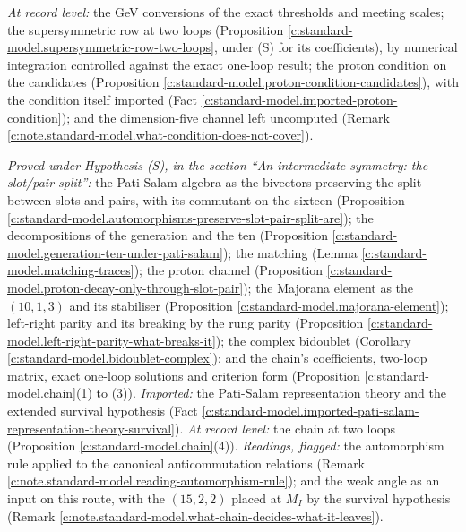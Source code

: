 \documentclass[11pt]{article}
\theoremstyle{definition}
\theoremstyle{plain}
\begin{document}
\emph{At record level:} the GeV conversions of the exact thresholds and meeting scales; the supersymmetric row at two loops (Proposition \ref{c:standard-model.supersymmetric-row-two-loops}, under (S) for its coefficients), by numerical integration controlled against the exact one-loop result; the proton condition on the candidates (Proposition \ref{c:standard-model.proton-condition-candidates}), with the condition itself imported (Fact \ref{c:standard-model.imported-proton-condition}); and the dimension-five channel left uncomputed (Remark \ref{c:note.standard-model.what-condition-does-not-cover}).

\emph{Proved under Hypothesis (S), in the section ``An intermediate symmetry: the slot/pair split'':} the Pati-Salam algebra as the bivectors preserving the split between slots and pairs, with its commutant on the sixteen (Proposition \ref{c:standard-model.automorphisms-preserve-slot-pair-split-are}); the decompositions of the generation and the ten (Proposition \ref{c:standard-model.generation-ten-under-pati-salam}); the matching (Lemma \ref{c:standard-model.matching-traces}); the proton channel (Proposition \ref{c:standard-model.proton-decay-only-through-slot-pair}); the Majorana element as the $(10,1,3)$ and its stabiliser (Proposition \ref{c:standard-model.majorana-element}); left-right parity and its breaking by the rung parity (Proposition \ref{c:standard-model.left-right-parity-what-breaks-it}); the complex bidoublet (Corollary \ref{c:standard-model.bidoublet-complex}); and the chain's coefficients, two-loop matrix, exact one-loop solutions and criterion form (Proposition \ref{c:standard-model.chain}(1) to (3)). \emph{Imported:} the Pati-Salam representation theory and the extended survival hypothesis (Fact \ref{c:standard-model.imported-pati-salam-representation-theory-survival}). \emph{At record level:} the chain at two loops (Proposition \ref{c:standard-model.chain}(4)). \emph{Readings, flagged:} the automorphism rule applied to the canonical anticommutation relations (Remark \ref{c:note.standard-model.reading-automorphism-rule}); and the weak angle as an input on this route, with the $(15,2,2)$ placed at $M_{I}$ by the survival hypothesis (Remark \ref{c:note.standard-model.what-chain-decides-what-it-leaves}).
\end{document}

